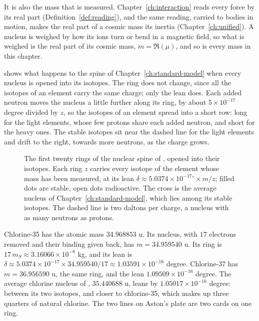 It is also the mass that is measured. Chapter~\ref{ch:interaction} reads every force by its real part (Definition~\ref{def:reading}), and the same reading, carried to bodies in motion, makes the real part of a cosmic mass its inertia (Chapter~\ref{ch:unified}). A nucleus is weighed by how its ions turn or bend in a magnetic field, so what is weighed is the real part of its cosmic mass, $m = \Re(\mu)$, and so is every mass in this chapter.

 shows what happens to the spine of Chapter~\ref{ch:standard-model} when every nucleus is opened into its isotopes. The ring does not change, since all the isotopes of an element carry the same charge; only the lean does. Each added neutron moves the nucleus a little further along its ring, by about $5 \times 10^{-17}$ degree divided by $z$, so the isotopes of an element spread into a short row: long for the light elements, whose few protons share each added neutron, and short for the heavy ones. The stable isotopes sit near the dashed line for the light elements and drift to the right, towards more neutrons, as the charge grows.

\suppressfloats[t]
\begin{figure}[tb]
\myfloatalign

\caption[The rings of the spine opened into isotopes]{The first twenty rings of the nuclear spine of , opened into their isotopes. Each ring $z$ carries every isotope of the element whose mass has been measured, at its lean $\delta \approx 5.0374 \times 10^{-17}{}^\circ \times m/z$; filled dots are stable, open dots radioactive. The cross is the average nucleus of Chapter~\ref{ch:standard-model}, which lies among its stable isotopes. The dashed line is two daltons per charge, a nucleus with as many neutrons as protons.}
\label{fig:cl-isotopes}
\end{figure}

\begin{workedexample}
Chlorine-35 has the atomic mass $34.968853$ u. Its nucleus, with $17$ electrons removed and their binding given back, has $m = 34.959540$ u. Its ring is $17\,m_S \approx 3.16066 \times 10^{-8}$ kg, and its lean is $\delta \approx 5.0374 \times 10^{-17} \times 34.959540/17 \approx 1.03591 \times 10^{-16}$ degree. Chlorine-37 has $m = 36.956590$ u, the same ring, and the lean $1.09509 \times 10^{-16}$ degree. The average chlorine nucleus of , $35.440688$ u, leans by $1.05017 \times 10^{-16}$ degree: between its two isotopes, and closer to chlorine-35, which makes up three quarters of natural chlorine. The two lines on Aston's plate are two cards on one ring.
\end{workedexample}

